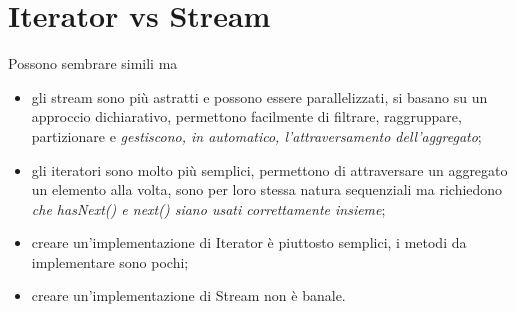 \section{Iterator vs Stream}

Possono sembrare simili ma
\begin{itemize}
    \item gli stream sono più astratti e possono essere parallelizzati, si basano su un approccio dichiarativo, permettono facilmente di filtrare, raggruppare, 
    partizionare e \textit{gestiscono, in automatico, l’attraversamento dell’aggregato};
    \item gli iteratori sono molto più semplici, permettono di attraversare un aggregato un elemento alla volta, sono per loro stessa natura sequenziali ma 
    richiedono \textit{che hasNext() e next() siano usati correttamente insieme};
    \item creare un’implementazione di Iterator è piuttosto semplici, i metodi da implementare sono pochi;
    \item creare un’implementazione di Stream non è banale.
\end{itemize}